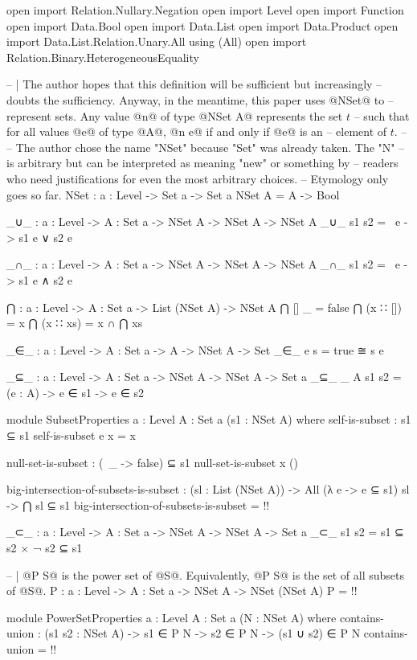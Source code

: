 \begin{code}
open import Relation.Nullary.Negation
open import Level
open import Function
open import Data.Bool
open import Data.List
open import Data.Product
open import Data.List.Relation.Unary.All using (All)
open import Relation.Binary.HeterogeneousEquality

-- | The author hopes that this definition will be sufficient but increasingly
-- doubts the sufficiency.  Anyway, in the meantime, this paper uses @NSet@ to
-- represent sets.  Any value @n@ of type @NSet A@ represents the set \(t\)
-- such that for all values @e@ of type @A@, @n e@ if and only if @e@ is an
-- element of \(t\).
--
-- The author chose the name "NSet" because "Set" was already taken.  The "N"
-- is arbitrary but can be interpreted as meaning "new" or something by
-- readers who need justifications for even the most arbitrary choices.
-- Etymology only goes so far.
NSet : {a : Level} -> Set a -> Set a
NSet A = A -> Bool

_∪_ : {a : Level} -> {A : Set a} -> NSet A -> NSet A -> NSet A
_∪_ s1 s2 = \ e -> s1 e ∨ s2 e

_∩_ : {a : Level} -> {A : Set a} -> NSet A -> NSet A -> NSet A
_∩_ s1 s2 = \ e -> s1 e ∧ s2 e

⋂ : {a : Level} -> {A : Set a} -> List (NSet A) -> NSet A
⋂ [] _ = false
⋂ (x ∷ []) = x
⋂ (x ∷ xs) = x ∩ ⋂ xs

_∈_ : {a : Level} -> {A : Set a} -> A -> NSet A -> Set
_∈_ e s = true ≅ s e

_⊆_ : {a : Level} -> {A : Set a} -> NSet A -> NSet A -> Set a
_⊆_ {_} {A} s1 s2 = (e : A) -> e ∈ s1 -> e ∈ s2

module SubsetProperties {a : Level} {A : Set a} (s1 : NSet A) where
  self-is-subset : s1 ⊆ s1
  self-is-subset e x = x

  null-set-is-subset : (\ _ -> false) ⊆ s1
  null-set-is-subset x ()

  big-intersection-of-subsets-is-subset :
    (sl : List (NSet A)) ->
    All (λ e -> e ⊆ s1) sl ->
    ⋂ sl ⊆ s1
  big-intersection-of-subsets-is-subset = {!!}

_⊂_ : {a : Level} -> {A : Set a} -> NSet A -> NSet A -> Set a
_⊂_ s1 s2 = s1 ⊆ s2 × ¬ s2 ⊆ s1

-- | @P S@ is the power set of @S@.  Equivalently, @P S@ is the set of all subsets of @S@.
P : {a : Level} -> {A : Set a} -> NSet A -> NSet (NSet A)
P = {!!}

module PowerSetProperties {a : Level} {A : Set a} (N : NSet A) where
  contains-union : (s1 s2 : NSet A) -> s1 ∈ P N -> s2 ∈ P N -> (s1 ∪ s2) ∈ P N
  contains-union = {!!}


\end{code}
